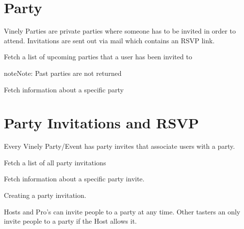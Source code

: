 \documentclass[letterpaper,10pt,english]{sphinxmanual}
\begin{document}
\section{Party}
\label{parties:party}
Vinely Parties are private parties where someone has to be invited in order to attend.
Invitations are sent out via mail which contains an RSVP link.

Fetch a list of upcoming parties that a user has been invited to


\begin{fulllineitems}
\label{parties:get--api-v1-party-}
\end{fulllineitems}


\begin{notice}{note}{Note:}
Past parties are not returned
\end{notice}

Fetch information about a specific party


\begin{fulllineitems}
\label{parties:get--api-v1-party-_id_-}
\end{fulllineitems}



\section{Party Invitations and RSVP}
\label{parties:party-invitations-and-rsvp}
Every Vinely Party/Event has party invites that associate users with a party.

Fetch a list of all party invitations


\begin{fulllineitems}
\label{parties:get--api-v1-partyinvite-}
\end{fulllineitems}


Fetch information about a specific party invite.


\begin{fulllineitems}
\label{parties:get--api-v1-partyinvite-_id_-}
\end{fulllineitems}


Creating a party invitation.

Hosts and Pro's can invite people to a party at any time.
Other tasters an only invite people to a party if the Host allows it.
\end{document}
